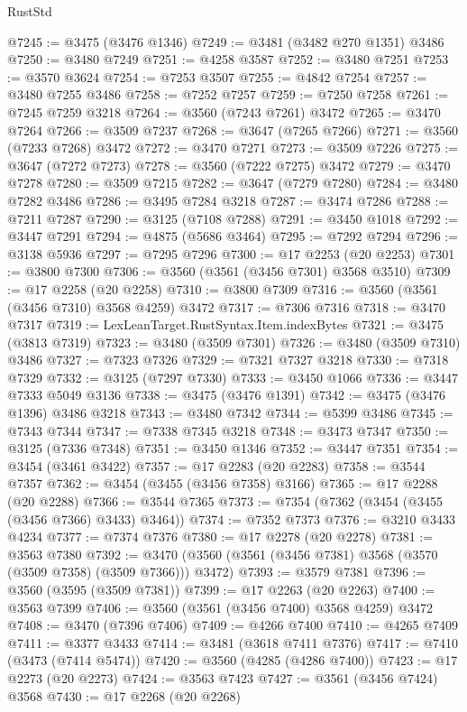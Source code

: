 \begin{lexlean}{RustStd}
\begin{coremodule}
@7245 := @3475 (@3476 @1346)
@7249 := @3481 (@3482 @270 @1351) @3486
@7250 := @3480 @7249
@7251 := @4258 @3587
@7252 := @3480 @7251
@7253 := @3570 @3624
@7254 := @7253 @3507
@7255 := @4842 @7254
@7257 := @3480 @7255 @3486
@7258 := @7252 @7257
@7259 := @7250 @7258
@7261 := @7245 @7259 @3218
@7264 := @3560 (@7243 @7261) @3472
@7265 := @3470 @7264
@7266 := @3509 @7237
@7268 := @3647 (@7265 @7266)
@7271 := @3560 (@7233 @7268) @3472
@7272 := @3470 @7271
@7273 := @3509 @7226
@7275 := @3647 (@7272 @7273)
@7278 := @3560 (@7222 @7275) @3472
@7279 := @3470 @7278
@7280 := @3509 @7215
@7282 := @3647 (@7279 @7280)
@7284 := @3480 @7282 @3486
@7286 := @3495 @7284 @3218
@7287 := @3474 @7286
@7288 := @7211 @7287
@7290 := @3125 (@7108 @7288)
@7291 := @3450 @1018
@7292 := @3447 @7291
@7294 := @4875 (@5686 @3464)
@7295 := @7292 @7294
@7296 := @3138 @5936
@7297 := @7295 @7296
@7300 := @17 @2253 (@20 @2253)
@7301 := @3800 @7300
@7306 := @3560 (@3561 (@3456 @7301) @3568 @3510)
@7309 := @17 @2258 (@20 @2258)
@7310 := @3800 @7309
@7316 := @3560 (@3561 (@3456 @7310) @3568 @4259) @3472
@7317 := @7306 @7316
@7318 := @3470 @7317
@7319 := LexLeanTarget.RustSyntax.Item.indexBytes
@7321 := @3475 (@3813 @7319)
@7323 := @3480 (@3509 @7301)
@7326 := @3480 (@3509 @7310) @3486
@7327 := @7323 @7326
@7329 := @7321 @7327 @3218
@7330 := @7318 @7329
@7332 := @3125 (@7297 @7330)
@7333 := @3450 @1066
@7336 := @3447 @7333 @5049 @3136
@7338 := @3475 (@3476 @1391)
@7342 := @3475 (@3476 @1396) @3486 @3218
@7343 := @3480 @7342
@7344 := @5399 @3486
@7345 := @7343 @7344
@7347 := @7338 @7345 @3218
@7348 := @3473 @7347
@7350 := @3125 (@7336 @7348)
@7351 := @3450 @1346
@7352 := @3447 @7351
@7354 := @3454 (@3461 @3422)
@7357 := @17 @2283 (@20 @2283)
@7358 := @3544 @7357
@7362 := @3454 (@3455 (@3456 @7358) @3166)
@7365 := @17 @2288 (@20 @2288)
@7366 := @3544 @7365
@7373 := @7354 (@7362 (@3454 (@3455 (@3456 @7366) @3433) @3464))
@7374 := @7352 @7373
@7376 := @3210 @3433 @4234
@7377 := @7374 @7376
@7380 := @17 @2278 (@20 @2278)
@7381 := @3563 @7380
@7392 := @3470 (@3560 (@3561 (@3456 @7381) @3568 (@3570 (@3509 @7358) (@3509 @7366))) @3472)
@7393 := @3579 @7381
@7396 := @3560 (@3595 (@3509 @7381))
@7399 := @17 @2263 (@20 @2263)
@7400 := @3563 @7399
@7406 := @3560 (@3561 (@3456 @7400) @3568 @4259) @3472
@7408 := @3470 (@7396 @7406)
@7409 := @4266 @7400
@7410 := @4265 @7409
@7411 := @3377 @3433
@7414 := @3481 (@3618 @7411 @7376)
@7417 := @7410 (@3473 (@7414 @5474))
@7420 := @3560 (@4285 (@4286 @7400))
@7423 := @17 @2273 (@20 @2273)
@7424 := @3563 @7423
@7427 := @3561 (@3456 @7424) @3568
@7430 := @17 @2268 (@20 @2268)

\end{coremodule}
\end{lexlean}
